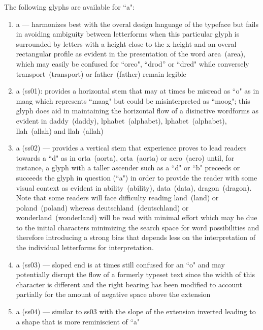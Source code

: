 The following glyphs are available for ``a":
\begin{enumerate}
  \item {\ssdefault a} --- harmonizes best with the overal design language of
    the typeface but fails in avoiding ambiguity between letterforms when this
    particular glyph is surrounded by letters with a height close to the
    x-height and an overal rectangular profile as evident in the presentation
    of the word \mbox{{\ssdefault area} (area)}, which may easily be confused
    for ``oreo", ``drod'' or ``dred" while conversely
    \mbox{{\ssdefault transport} (transport)} or
    \mbox{{\ssdefault father} (father)} remain legible
  \item {\ssone a} (ss01): provides a horizontal stem that may at times be
    misread as ``o" as in \mbox{\ssdefault m{\ssone aa}g} which represents
    ``maag" but could be misinterpreted as ``moog"; this glyph does aid in
    maintaining the horizontal flow of a disinctive wordforms as evident in
    \mbox{{\ssdefault d{\ssone a}ddy} (daddy)},
    \mbox{{lphabet} (alphabet)},
    \mbox{{lph{\ssone a}bet} (alphabet)},
    \mbox{{llah} (allah)} and
    \mbox{{ll{\ssone a}h} (allah)}
  \item {\sstwo a} (ss02) --- provides a vertical stem that experience proves
    to lead readers towards a ``d" as in
    \mbox{{orta} (aorta)},
    \mbox{{ort{\sstwo a}} (aorta)} or
    \mbox{{\sstwo aero} (aero)}
    until, for instance, a glyph with a taller ascender such as a ``d" or ``b"
    preceeds or succeeds the glyph in question (``a") in order to provide
    the reader with some visual context as evident in
    \mbox{{\sstwo ability} (ability)},
    \mbox{{\sstwo data} (data)},
    \mbox{{\sstwo dragon} (dragon)}. Note that some readers will face
    difficulty reading \mbox{{\sstwo land} (land)} or
    \mbox{{\sstwo poland} (poland)} whereas \mbox{{\sstwo deutschland} (deutschland)} or
    \mbox{{\sstwo wonderland} (wonderland)}
    will be read with minimal effort which may be due to the initial
    characters minimizing the search space for word possibilities and therefore
    introducing a strong bias that depends less on the interpretation of the
    individual letterforms for interpretation.
  \item {\ssthree a} (ss03) --- sloped end is at times still confused for an
    ``o" and may potentially disrupt the flow of a formerly typeset text since
    the width of this character is different and the right bearing has been
    modified to account partially for the amount of negative space above the
    extension
  \item {\ssfour a} (ss04) --- similar to ss03 with the slope of the extension
    inverted leading to a shape that is more reminiscient of ``a"
\end{enumerate}
